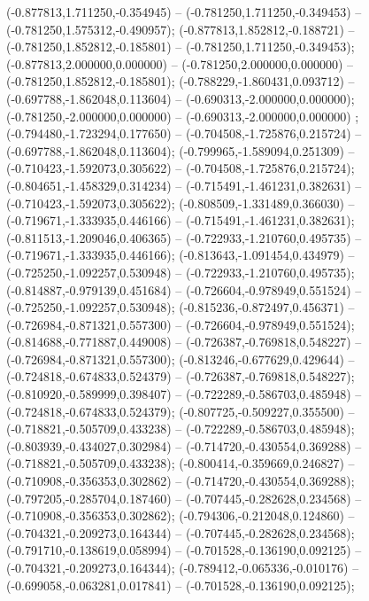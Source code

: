  (-0.877813,1.711250,-0.354945) -- (-0.781250,1.711250,-0.349453) -- (-0.781250,1.575312,-0.490957);
 (-0.877813,1.852812,-0.188721) -- (-0.781250,1.852812,-0.185801) -- (-0.781250,1.711250,-0.349453);
 (-0.877813,2.000000,0.000000) -- (-0.781250,2.000000,0.000000) -- (-0.781250,1.852812,-0.185801);
 (-0.788229,-1.860431,0.093712) -- (-0.697788,-1.862048,0.113604) -- (-0.690313,-2.000000,0.000000);
 (-0.781250,-2.000000,0.000000) -- (-0.690313,-2.000000,0.000000) ;
 (-0.794480,-1.723294,0.177650) -- (-0.704508,-1.725876,0.215724) -- (-0.697788,-1.862048,0.113604);
 (-0.799965,-1.589094,0.251309) -- (-0.710423,-1.592073,0.305622) -- (-0.704508,-1.725876,0.215724);
 (-0.804651,-1.458329,0.314234) -- (-0.715491,-1.461231,0.382631) -- (-0.710423,-1.592073,0.305622);
 (-0.808509,-1.331489,0.366030) -- (-0.719671,-1.333935,0.446166) -- (-0.715491,-1.461231,0.382631);
 (-0.811513,-1.209046,0.406365) -- (-0.722933,-1.210760,0.495735) -- (-0.719671,-1.333935,0.446166);
 (-0.813643,-1.091454,0.434979) -- (-0.725250,-1.092257,0.530948) -- (-0.722933,-1.210760,0.495735);
 (-0.814887,-0.979139,0.451684) -- (-0.726604,-0.978949,0.551524) -- (-0.725250,-1.092257,0.530948);
 (-0.815236,-0.872497,0.456371) -- (-0.726984,-0.871321,0.557300) -- (-0.726604,-0.978949,0.551524);
 (-0.814688,-0.771887,0.449008) -- (-0.726387,-0.769818,0.548227) -- (-0.726984,-0.871321,0.557300);
 (-0.813246,-0.677629,0.429644) -- (-0.724818,-0.674833,0.524379) -- (-0.726387,-0.769818,0.548227);
 (-0.810920,-0.589999,0.398407) -- (-0.722289,-0.586703,0.485948) -- (-0.724818,-0.674833,0.524379);
 (-0.807725,-0.509227,0.355500) -- (-0.718821,-0.505709,0.433238) -- (-0.722289,-0.586703,0.485948);
 (-0.803939,-0.434027,0.302984) -- (-0.714720,-0.430554,0.369288) -- (-0.718821,-0.505709,0.433238);
 (-0.800414,-0.359669,0.246827) -- (-0.710908,-0.356353,0.302862) -- (-0.714720,-0.430554,0.369288);
 (-0.797205,-0.285704,0.187460) -- (-0.707445,-0.282628,0.234568) -- (-0.710908,-0.356353,0.302862);
 (-0.794306,-0.212048,0.124860) -- (-0.704321,-0.209273,0.164344) -- (-0.707445,-0.282628,0.234568);
 (-0.791710,-0.138619,0.058994) -- (-0.701528,-0.136190,0.092125) -- (-0.704321,-0.209273,0.164344);
 (-0.789412,-0.065336,-0.010176) -- (-0.699058,-0.063281,0.017841) -- (-0.701528,-0.136190,0.092125);
